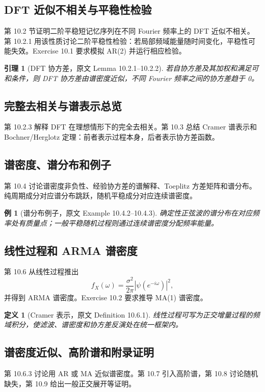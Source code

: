 \documentclass[11pt,a4paper,openany]{ctexbook}
\newtheorem{definition}{定义}[section]
\newtheorem{lemma}{引理}[section]
\newtheorem{example}{例}[section]
\begin{document}
\subsection{DFT 近似不相关与平稳性检验}
第 10.2 节证明二阶平稳短记忆序列在不同 Fourier 频率上的 DFT 近似不相关。第 10.2.1 用该性质讨论二阶平稳性检验：若局部频域能量随时间变化，平稳性可能失效。Exercise 10.1 要求模拟 AR(2) 并运行相应检验。

\begin{lemma}[DFT 协方差，原文 Lemma 10.2.1--10.2.2]
若自协方差及其加权和满足可和条件，则 DFT 协方差由谱密度近似，不同 Fourier 频率之间的协方差趋于 0。
\end{lemma}

\subsection{完整去相关与谱表示总览}
第 10.2.3 解释 DFT 在理想情形下的完全去相关。第 10.3 总结 Cramer 谱表示和 Bochner/Herglotz 定理：前者表示过程本身，后者表示协方差函数。

\subsection{谱密度、谱分布和例子}
第 10.4 讨论谱密度非负性、经验协方差的谱解释、Toeplitz 方差矩阵和谱分布。纯周期成分对应谱分布跳跃，随机平稳成分对应连续谱密度。

\begin{example}[谱分布例子，原文 Example 10.4.2--10.4.3]
确定性正弦波的谱分布在对应频率处有质量点；一般平稳随机过程则通过连续谱密度分配频率能量。
\end{example}

\subsection{线性过程和 ARMA 谱密度}
第 10.6 从线性过程推出
\[
  f_X(\omega)=\frac{\sigma^2}{2\pi}|\psi(e^{-i\omega})|^2,
\]
并得到 ARMA 谱密度。Exercise 10.2 要求推导 MA(1) 谱密度。

\begin{definition}[Cramer 表示，原文 Definition 10.6.1]
线性过程可写为正交增量过程的频域积分，使滤波、谱密度和协方差反演处在统一框架内。
\end{definition}

\subsection{谱密度近似、高阶谱和附录证明}
第 10.6.3 讨论用 AR 或 MA 近似谱密度。第 10.7 引入高阶谱，第 10.8 讨论随机缺失，第 10.9 给出一般正交展开等证明。
\end{document}

